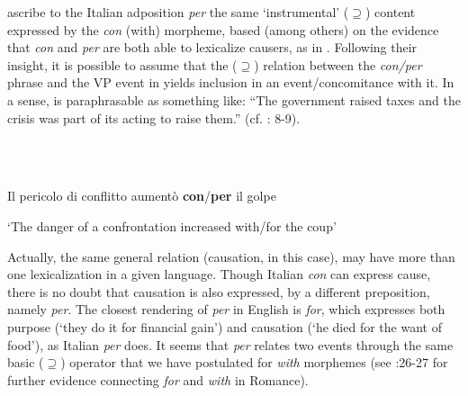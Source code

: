 \documentclass[output=paper,colorlinks,citecolor=brown]{./langscibook}
\begin{document}
\citet{FrancoManzini2017b} ascribe to the Italian adposition \textit{per} the same ‘instrumental’ (${\supseteq}$) content expressed by the \textit{con} (with) morpheme, based (among others) on the evidence that \textit{con} and \textit{per} are both able to lexicalize causers, as in . Following their insight, it is possible to assume that the (${\supseteq}$) relation between the \textit{con/per} phrase and the VP event in  yields inclusion in an event/concomitance with it. In a sense,  is paraphrasable as something like: “The government raised taxes and the crisis was part of its acting to raise them.” (cf. \citealt{FrancoManzini2017b}: 8-9).

\ea%
    \label{ex:key:24}
    \gll\\
        \\
    \glt
    \z

          Il pericolo di conflitto aumentò \textbf{con}/\textbf{per} il golpe

  ‘The danger of a confrontation increased with/for the coup’

Actually, the same general relation (causation, in this case), may have more than one lexicalization in a given language. Though Italian \textit{con} can express cause, there is no doubt that causation is also expressed, by a different preposition, namely \textit{per}. The closest rendering of \textit{per} in English is \textit{for}, which expresses both purpose (‘they do it for financial gain’) and causation (‘he died for the want of food’), as Italian \textit{per} does. It seems that \textit{per} relates two events through the same basic (${\supseteq}$) operator that we have postulated for \textit{with} morphemes (see \citealt{FrancoManzini2017b}:26-27 for further evidence connecting \textit{for} and \textit{with} in Romance).
\end{document}
